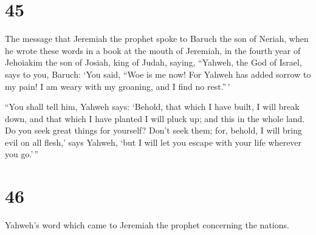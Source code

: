 \hypertarget{section-44}{%
\section{45}\label{section-44}}

 The message that Jeremiah the prophet spoke to Baruch the
son of Neriah, when he wrote these words in a book at the mouth of
Jeremiah, in the fourth year of Jehoiakim the son of Josiah, king of
Judah, saying,  ``Yahweh, the God of Israel, says to you,
Baruch:  `You said, ``Woe is me now! For Yahweh has added
sorrow to my pain! I am weary with my groaning, and I find no rest.''\,'

 ``You shall tell him, Yahweh says: `Behold, that which I
have built, I will break down, and that which I have planted I will
pluck up; and this in the whole land.  Do you seek great
things for yourself? Don't seek them; for, behold, I will bring evil on
all flesh,' says Yahweh, `but I will let you escape with your life
wherever you go.'\,''

\hypertarget{section-45}{%
\section{46}\label{section-45}}

 Yahweh's word which came to Jeremiah the prophet
concerning the nations.

